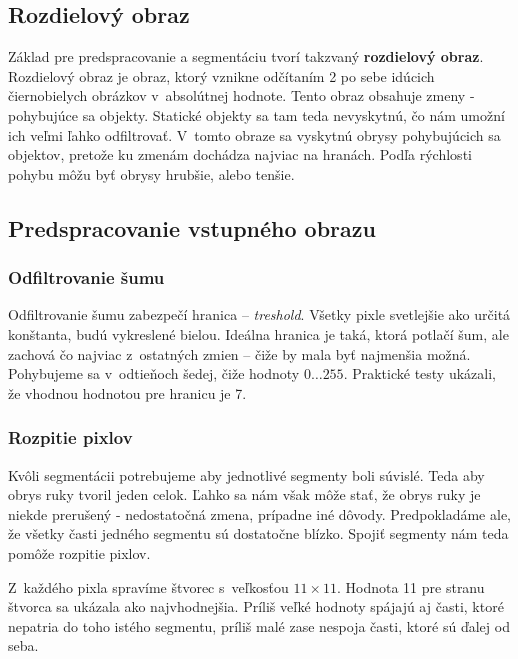 \subsection{Rozdielový obraz}\label{chap:diffimg}

Základ pre predspracovanie a segmentáciu tvorí takzvaný \textbf{rozdielový obraz}. Rozdielový obraz je obraz, ktorý vznikne odčítaním 2 po sebe idúcich čiernobielych obrázkov v~absolútnej hodnote. Tento obraz obsahuje zmeny - pohybujúce sa objekty. Statické objekty sa tam teda nevyskytnú, čo nám umožní ich veľmi ľahko odfiltrovať. V~tomto obraze sa vyskytnú obrysy pohybujúcich sa objektov, pretože ku zmenám dochádza najviac na hranách. Podľa rýchlosti pohybu môžu byť obrysy hrubšie, alebo tenšie. 

\subsection{Predspracovanie vstupného obrazu}\label{chap:preprocess}



\subsubsection{Odfiltrovanie šumu}
Odfiltrovanie šumu zabezpečí hranica -- \textit{treshold}. Všetky pixle svetlejšie ako určitá konštanta, budú vykreslené bielou. Ideálna hranica je taká, ktorá potlačí šum, ale zachová čo najviac z~ostatných zmien -- čiže by mala byť najmenšia možná. Pohybujeme sa v~odtieňoch šedej, čiže hodnoty $0\dots 255$. Praktické testy ukázali, že vhodnou hodnotou pre hranicu je 7.

\subsubsection{Rozpitie pixlov}

Kvôli segmentácii potrebujeme aby jednotlivé segmenty boli súvislé. Teda aby obrys ruky tvoril jeden celok.
Ľahko sa nám však môže stať, že obrys ruky je niekde prerušený - nedostatočná zmena, prípadne iné dôvody. Predpokladáme ale, že všetky časti jedného segmentu sú dostatočne blízko. Spojiť segmenty nám teda pomôže rozpitie pixlov. 

Z~každého pixla spravíme štvorec s~veľkosťou $11\times 11$.
Hodnota 11 pre stranu štvorca sa ukázala ako najvhodnejšia. 
Príliš veľké hodnoty spájajú aj časti, ktoré nepatria do toho istého segmentu, príliš malé zase nespoja časti, ktoré sú ďalej od seba.

